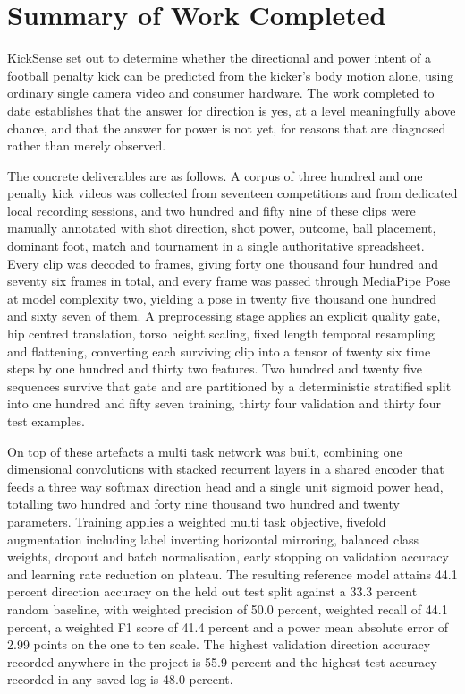 \section{Summary of Work Completed}

KickSense set out to determine whether the directional and power intent of a football penalty kick can be predicted from the kicker's body motion alone, using ordinary single camera video and consumer hardware. The work completed to date establishes that the answer for direction is yes, at a level meaningfully above chance, and that the answer for power is not yet, for reasons that are diagnosed rather than merely observed.

The concrete deliverables are as follows. A corpus of three hundred and one penalty kick videos was collected from seventeen competitions and from dedicated local recording sessions, and two hundred and fifty nine of these clips were manually annotated with shot direction, shot power, outcome, ball placement, dominant foot, match and tournament in a single authoritative spreadsheet. Every clip was decoded to frames, giving forty one thousand four hundred and seventy six frames in total, and every frame was passed through MediaPipe Pose at model complexity two, yielding a pose in twenty five thousand one hundred and sixty seven of them. A preprocessing stage applies an explicit quality gate, hip centred translation, torso height scaling, fixed length temporal resampling and flattening, converting each surviving clip into a tensor of twenty six time steps by one hundred and thirty two features. Two hundred and twenty five sequences survive that gate and are partitioned by a deterministic stratified split into one hundred and fifty seven training, thirty four validation and thirty four test examples.

On top of these artefacts a multi task network was built, combining one dimensional convolutions with stacked recurrent layers in a shared encoder that feeds a three way softmax direction head and a single unit sigmoid power head, totalling two hundred and forty nine thousand two hundred and twenty parameters. Training applies a weighted multi task objective, fivefold augmentation including label inverting horizontal mirroring, balanced class weights, dropout and batch normalisation, early stopping on validation accuracy and learning rate reduction on plateau. The resulting reference model attains 44.1 percent direction accuracy on the held out test split against a 33.3 percent random baseline, with weighted precision of 50.0 percent, weighted recall of 44.1 percent, a weighted F1 score of 41.4 percent and a power mean absolute error of 2.99 points on the one to ten scale. The highest validation direction accuracy recorded anywhere in the project is 55.9 percent and the highest test accuracy recorded in any saved log is 48.0 percent.

